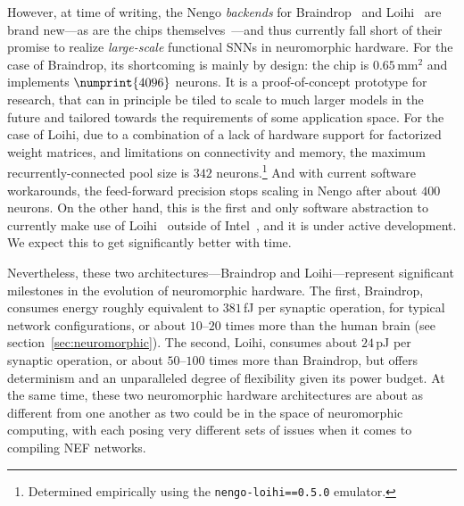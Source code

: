 However, at time of writing, the Nengo \emph{backends} for Braindrop~\citep{braindrop2019} and Loihi~\citep{nengoloihi} are brand new---as are the chips themselves~\citep{neckar2018braindrop, davies2018loihi}---and thus currently fall short of their promise to realize \emph{large-scale} functional SNNs in neuromorphic hardware.
For the case of Braindrop, its shortcoming is mainly by design: the chip is $0.65$\,mm${}^2$ and implements $\numprint{4096}$ neurons.
It is a proof-of-concept prototype for research, that can in principle be tiled to scale to much larger models in the future and tailored towards the requirements of some application space.
For the case of Loihi, due to a combination of a lack of hardware support for factorized weight matrices, and limitations on connectivity and memory, the maximum recurrently-connected pool size is $342$ neurons.\footnote{%
Determined empirically using the \texttt{nengo-loihi==0.5.0} emulator.}
And with current software workarounds, the feed-forward precision stops scaling in Nengo after about $400$ neurons.
On the other hand, this is the first and only software abstraction to currently make use of Loihi~\citep{blouw2018a} outside of Intel~\citep{lin2018mapping}, and it is under active development.
We expect this to get significantly better with time.

Nevertheless, these two architectures---Braindrop and Loihi---represent significant milestones in the evolution of neuromorphic hardware.
The first, Braindrop, consumes energy roughly equivalent to $381$\,fJ per synaptic operation, for typical network configurations, or about $10$--$20$ times more than the human brain (see section~\ref{sec:neuromorphic}).
The second, Loihi, consumes about $24$\,pJ per synaptic operation, or about $50$--$100$ times more than Braindrop, but offers determinism and an unparalleled degree of flexibility given its power budget.
At the same time, these two neuromorphic hardware architectures are about as different from one another as two could be in the space of neuromorphic computing, with each posing very different sets of issues when it comes to compiling NEF networks.

